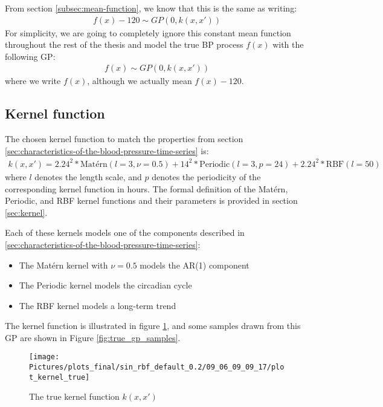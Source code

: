 From section \ref{subsec:mean-function}, we know that this is the same as writing:
\begin{gather*}
    f(x) - 120 \sim GP(0, k(x,x'))
\end{gather*}
For simplicity, we are going to completely ignore this constant
mean function throughout the rest of the thesis and
model the true BP process $f(x)$ with the following GP:
\begin{gather*}
    f(x) \sim GP(0, k(x,x'))
\end{gather*}
where we write $f(x)$, although we actually mean $f(x) - 120$.


\subsection{Kernel function}
The chosen kernel function to match the properties from
section \ref{sec:characteristics-of-the-blood-pressure-time-series} is:
\begin{gather*}\label{def:true_gp}
k(x, x') = 2.24^{2} * \text{Matérn}(l=3, \nu=0.5) +
14^{2} * \text{Periodic}(l=3, p=24) +  2.24^{2} * \text{RBF}(l=50)
\end{gather*}
where $l$ denotes the length scale, and $p$ denotes the periodicity
of the corresponding kernel function in hours.
The formal definition of the Matérn, Periodic, and RBF kernel
functions and their parameters is provided in section \ref{sec:kernel}.

Each of these kernels models one of the components described in
\ref{sec:characteristics-of-the-blood-pressure-time-series}:
\begin{itemize}
    \item The Matérn kernel with $\nu=0.5$ models the AR(1) component
    \item The Periodic kernel models the circadian cycle
    \item The RBF kernel models a long-term trend
\end{itemize}

The kernel function is illustrated in figure \ref{fig:true_kernel}, and
some samples drawn from this GP are shown in Figure \ref{fig:true_gp_samples}.

\begin{figure}[!htb]
    \centering
    \texttt{[image: Pictures/plots\_final/sin\_rbf\_default\_0.2/09\_06\_09\_09\_17/plot\_kernel\_true]}
    \caption{The true kernel function $k(x,x')$}
    \label{fig:true_kernel}
\end{figure}


